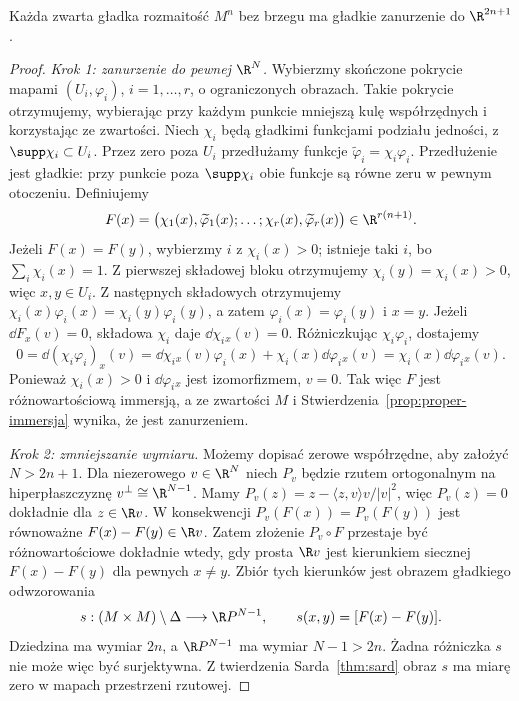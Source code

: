 \begin{twierdzenie}
\label{thm:whitney-slabe}
Każda zwarta gładka rozmaitość $M^n$ bez brzegu
ma gładkie zanurzenie do $\R^{2n+1}$.
\end{twierdzenie}
\begin{proof}
\emph{Krok 1: zanurzenie do pewnej $\R^N$.}
Wybierzmy skończone pokrycie mapami $(U_i,\varphi_i)$,
$i=1,\ldots,r$, o ograniczonych obrazach. Takie pokrycie
otrzymujemy, wybierając przy każdym punkcie mniejszą
kulę współrzędnych i korzystając ze zwartości. Niech $\chi_i$ będą gładkimi
funkcjami podziału jedności, z
$\supp\chi_i\subset U_i$. Przez zero poza $U_i$
przedłużamy funkcje
$\widetilde\varphi_i=\chi_i\varphi_i$.
Przedłużenie jest gładkie: przy punkcie poza
$\supp\chi_i$ obie funkcje są równe zeru
w pewnym otoczeniu. Definiujemy
\[
 F(x)=\bigl(\chi_1(x),\widetilde\varphi_1(x);
       \ldots;\chi_r(x),\widetilde\varphi_r(x)\bigr)
       \in\R^{r(n+1)}.
\]
Jeżeli $F(x)=F(y)$, wybierzmy $i$ z
$\chi_i(x)>0$; istnieje taki $i$, bo
$\sum_i\chi_i(x)=1$. Z pierwszej składowej
bloku otrzymujemy $\chi_i(y)=\chi_i(x)>0$,
więc $x,y\in U_i$. Z następnych składowych
otrzymujemy
$\chi_i(x)\varphi_i(x)=\chi_i(y)\varphi_i(y)$,
a zatem $\varphi_i(x)=\varphi_i(y)$ i $x=y$.
Jeżeli $\dd F_x(v)=0$, składowa $\chi_i$
daje $\dd\chi_i{}_x(v)=0$. Różniczkując
$\chi_i\varphi_i$, dostajemy
\[
 0=\dd(\chi_i\varphi_i)_x(v)
 =\dd\chi_i{}_x(v)\varphi_i(x)
       +\chi_i(x)\dd\varphi_i{}_x(v)
 =\chi_i(x)\dd\varphi_i{}_x(v).
\]
Ponieważ $\chi_i(x)>0$ i $\dd\varphi_i{}_x$
jest izomorfizmem, $v=0$. Tak więc $F$
jest różnowartościową immersją, a ze
zwartości $M$ i Stwierdzenia~\ref{prop:proper-immersja}
wynika, że jest zanurzeniem.

\emph{Krok 2: zmniejszanie wymiaru.}
Możemy dopisać zerowe współrzędne, aby
założyć $N>2n+1$. Dla niezerowego
$v\in\R^N$ niech $P_v$ będzie rzutem
ortogonalnym na hiperpłaszczyznę
$v^\perp\cong\R^{N-1}$. Mamy
$P_v(z)=z-\langle z,v\rangle v/|v|^2$,
więc $P_v(z)=0$ dokładnie dla $z\in\R v$.
W konsekwencji
$P_v(F(x))=P_v(F(y))$ jest równoważne
$F(x)-F(y)\in\R v$.
Zatem złożenie $P_v\circ F$
przestaje być różnowartościowe dokładnie
wtedy, gdy prosta $\R v$ jest kierunkiem
siecznej $F(x)-F(y)$ dla pewnych $x\ne y$.
Zbiór tych kierunków jest obrazem
gładkiego odwzorowania
\[
 s:(M\times M)\setminus\Delta\longrightarrow
       \R P^{N-1},\qquad
 s(x,y)=[F(x)-F(y)].
\]
Dziedzina ma wymiar $2n$, a $\R P^{N-1}$
ma wymiar $N-1>2n$. Żadna różniczka $s$
nie może więc być surjektywna.
Z twierdzenia Sarda~\ref{thm:sard} obraz
$s$ ma miarę zero w mapach przestrzeni
rzutowej.


\end{proof}
